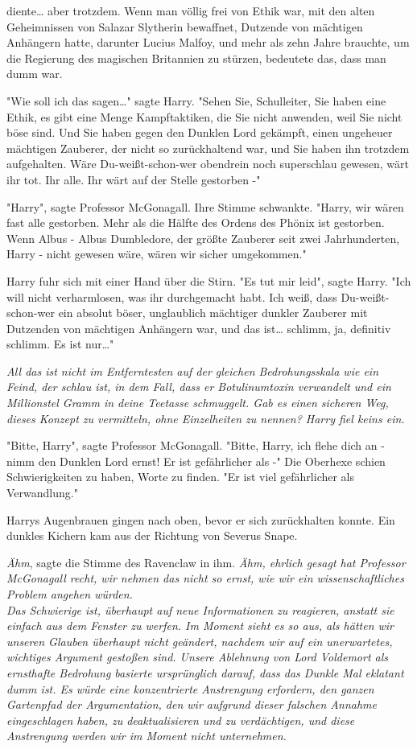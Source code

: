 {diente… aber trotzdem. Wenn man völlig frei von Ethik war, mit den alten Geheimnissen von Salazar Slytherin bewaffnet, Dutzende von mächtigen Anhängern hatte, darunter Lucius Malfoy, und mehr als zehn Jahre brauchte, um die Regierung des magischen Britannien zu stürzen, bedeutete das, dass man dumm war.

"Wie soll ich das sagen…" sagte Harry. "Sehen Sie, Schulleiter, Sie haben eine Ethik, es gibt eine Menge Kampftaktiken, die Sie nicht anwenden, weil Sie nicht böse sind. Und Sie haben gegen den Dunklen Lord gekämpft, einen ungeheuer mächtigen Zauberer, der nicht so zurückhaltend war, und Sie haben ihn trotzdem aufgehalten. Wäre Du-weißt-schon-wer obendrein noch superschlau gewesen, wärt ihr tot. Ihr alle. Ihr wärt auf der Stelle gestorben -"

"Harry", sagte Professor McGonagall. Ihre Stimme schwankte. "Harry, wir wären fast alle gestorben. Mehr als die Hälfte des Ordens des Phönix ist gestorben. Wenn Albus - Albus Dumbledore, der größte Zauberer seit zwei Jahrhunderten, Harry - nicht gewesen wäre, wären wir sicher umgekommen."

Harry fuhr sich mit einer Hand über die Stirn. "Es tut mir leid", sagte Harry. "Ich will nicht verharmlosen, was ihr durchgemacht habt. Ich weiß, dass Du-weißt-schon-wer ein absolut böser, unglaublich mächtiger dunkler Zauberer mit Dutzenden von mächtigen Anhängern war, und das ist… schlimm, ja, definitiv schlimm. Es ist nur…"

\emph{All das ist nicht im Entferntesten auf der gleichen Bedrohungsskala wie ein Feind, der schlau ist, in dem Fall, dass er Botulinumtoxin verwandelt und ein Millionstel Gramm in deine Teetasse schmuggelt. Gab es einen sicheren Weg, dieses Konzept zu vermitteln, ohne Einzelheiten zu nennen? Harry fiel keins ein.}

"Bitte, Harry", sagte Professor McGonagall. "Bitte, Harry, ich flehe dich an - nimm den Dunklen Lord ernst! Er ist gefährlicher als -" Die Oberhexe schien Schwierigkeiten zu haben, Worte zu finden. "Er ist viel gefährlicher als Verwandlung."

Harrys Augenbrauen gingen nach oben, bevor er sich zurückhalten konnte. Ein dunkles Kichern kam aus der Richtung von Severus Snape.

\emph{Ähm}, sagte die Stimme des Ravenclaw in ihm. \emph{Ähm, ehrlich gesagt hat Professor McGonagall recht, wir nehmen das nicht so ernst, wie wir ein wissenschaftliches Problem angehen würden.}\\ \emph{Das Schwierige ist, überhaupt auf neue Informationen zu reagieren, anstatt sie einfach aus dem Fenster zu werfen. Im Moment sieht es so aus, als hätten wir unseren Glauben überhaupt nicht geändert, nachdem wir auf ein unerwartetes, wichtiges Argument gestoßen sind. Unsere Ablehnung von Lord Voldemort als ernsthafte Bedrohung basierte ursprünglich darauf, dass das Dunkle Mal eklatant dumm ist. Es würde eine konzentrierte Anstrengung erfordern, den ganzen Gartenpfad der Argumentation, den wir aufgrund dieser falschen Annahme eingeschlagen haben, zu deaktualisieren und zu verdächtigen, und diese Anstrengung werden wir im Moment nicht unternehmen.}

}
